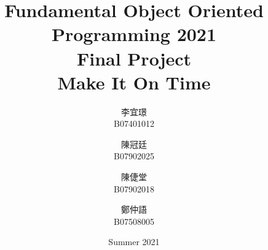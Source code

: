 \title{Fundamental Object Oriented Programming 2021 \\ Final Project \\ \textbf{Make It On Time}} %
\author{
    李宜璟\\B07401012\\
    \and
    陳冠廷\\B07902025\\
    \and
    陳倢堂\\B07902018\\
    \and
    鄭仲語\\B07508005\\
}
\date{Summer 2021}
\begin{titlingpage}
\null  %
\nointerlineskip  %
\vfill
\let\snewpage \newpage
\let\newpage \relax
\maketitle
\thispagestyle{empty}
\let \newpage \snewpage
\vfill 
\break %
\end{titlingpage}


